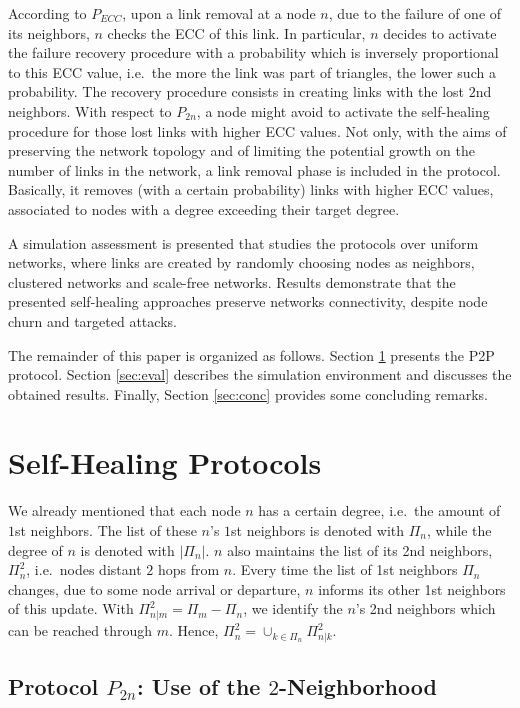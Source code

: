 \documentclass[10pt, conference, compsocconf]{IEEEtran}
\begin{document}
According to $P_{ECC}$, upon a link removal at a node $n$, due to the failure of one of its neighbors, $n$ checks the ECC of this link. In particular, $n$ decides to activate the failure recovery procedure with a probability which is inversely proportional to this ECC value, i.e.~the more the link was part of triangles, the lower such a probability. 
The recovery procedure consists in creating links with the lost $2$nd neighbors.
With respect to $P_{2n}$, a node might avoid to activate the self-healing procedure for those lost links with higher ECC values.
Not only, with the aims of preserving the network topology and of limiting the potential growth on the number of links in the network, a link removal phase is included in the protocol. Basically, it removes (with a certain probability) links with higher ECC values, associated to nodes with a degree exceeding their target degree.

A simulation assessment is presented that studies the protocols over uniform networks, where links are created by randomly choosing nodes as neighbors, clustered networks and scale-free networks. 
Results demonstrate that the presented self-healing approaches preserve networks connectivity, despite node churn and targeted attacks.


The remainder of this paper is organized as follows. Section \ref{sec:prot} presents the P2P protocol. Section \ref{sec:eval} describes the simulation environment and discusses the obtained results. Finally, Section \ref{sec:conc} provides some concluding remarks.

\section{Self-Healing Protocols}\label{sec:prot}

We already mentioned that each node $n$ has a certain degree, i.e.~the amount of $1$st neighbors. 
The list of these $n$'s $1$st neighbors is denoted with $\Pi_n$, while the degree of $n$ is denoted with $|\Pi_n|$. $n$ also maintains the list of its 2nd neigh\-bors, $\Pi^2_n$, i.e.~nodes distant $2$ hops from $n$. 
Every time the list of 1st neighbors $\Pi_n$
changes, due to some node arrival or departure, $n$ informs its other 1st neighbors of this update.
With $\Pi^2_{n|m} = \Pi_m - \Pi_n$, we identify the $n$'s 2nd neighbors which can be reached through $m$. Hence, $\Pi^2_n = \cup_{k \in \Pi_n} \Pi^2_{n|k}$.

\subsection{Protocol $P_{2n}$: Use of the $2$-Neighborhood}
\end{document}
